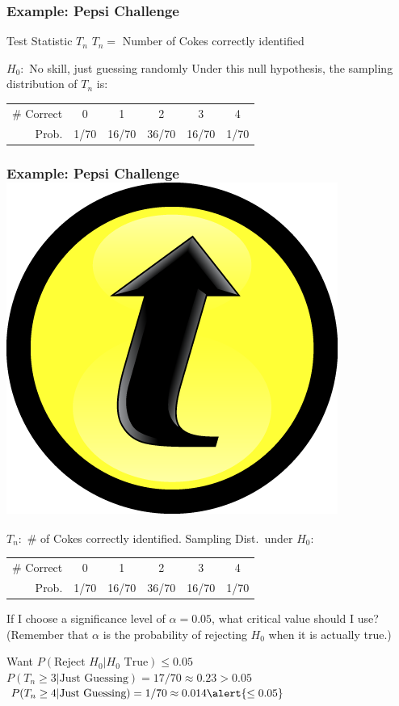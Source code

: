 \documentclass[handout]{beamer}
\begin{document}
\begin{frame}
\frametitle{Example: Pepsi Challenge}
	\begin{block}{Test Statistic $T_n$}
		$T_n =$ Number of Cokes correctly identified
\end{block} 
	\begin{block}{$H_0\colon$ No skill, just guessing randomly}
	Under this null hypothesis, the sampling distribution of $T_n$ is:
		\begin{center}
		\begin{tabular}{rccccc}
		\hline
		\# Correct & 0 & 1 & 2 & 3 & 4\\
		Prob.&1/70 & 16/70 & 36/70 & 16/70 &1/70\\
		\hline
		\end{tabular}
	\end{center}
\end{block}


\end{frame}
\begin{frame}
\frametitle{Example: Pepsi Challenge \hfill \includegraphics[scale = 0.05]{./images/clicker}}
$T_n\colon$ \# of Cokes correctly identified. Sampling Dist.\ under $H_0$:
		\begin{center}
		\begin{tabular}{rccccc}
		\hline
		\# Correct & 0 & 1 & 2 & 3 & 4\\
		Prob.&1/70 & 16/70 & 36/70 & 16/70 &1/70\\
		\hline
		\end{tabular}
	\end{center}
	\alert{If I choose a significance level of $\alpha =0.05$, what critical value should I use?}\\ (Remember that $\alpha$ is the probability of rejecting $H_0$ when it is actually true.)
	\pause
	
	\vspace{2em}
	Want $P(\mbox{Reject } H_0|H_0 \mbox{ True})\leq 0.05$\\ 
	$P(T_n \geq 3 |\mbox{Just Guessing}) = 17/70 \approx 0.23 > 0.05$ 
	$P(T_n \geq 4 |\mbox{Just Guessing}) = 1/70 \approx 0.014 \alert{\leq 0.05}$ 
\end{frame}
\end{document}

